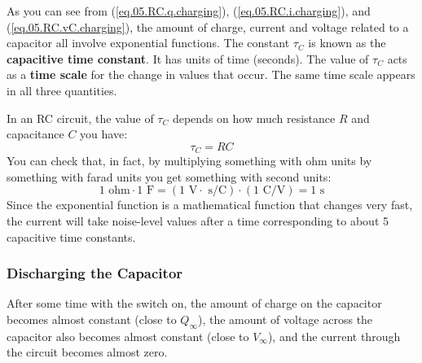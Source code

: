 As you can see from (\ref{eq.05.RC.q.charging}), (\ref{eq.05.RC.i.charging}), and (\ref{eq.05.RC.vC.charging}), the amount of charge, current and voltage related to a capacitor all involve exponential functions. The constant $\tau_{C}$ is known as the \textbf{capacitive time constant}. It has units of time (seconds). The value of $\tau_{C}$ acts as a \textbf{time scale} for the change in values that occur. The same time scale appears in all three quantities.

In an RC circuit, the value of $\tau_{C}$ depends on how much resistance $R$ and capacitance $C$ you have:
\begin{equation}
    \tau_{C} = R C
    \label{eq.05.tauC}
\end{equation}
You can check that, in fact, by multiplying something with ohm units by something with farad units you get something with second units:
\begin{equation}
    1 \text{ ohm} \cdot 1 \text{ F} = \left(1 \text{ V}\cdot\text{ s/C}\right) \cdot \left(1 \text{ C/V}\right) = 1 \text{ s}
\end{equation}
Since the exponential function is a mathematical function that changes very fast, the current will take noise-level values after a time corresponding to about 5 capacitive time constants.
\subsubsection{Discharging the Capacitor}
After some time with the switch on, the amount of charge on the capacitor becomes almost constant (close to $Q_{\infty}$), the amount of voltage across the capacitor also becomes almost constant (close to $V_{\infty}$), and the current through the circuit becomes almost zero.

